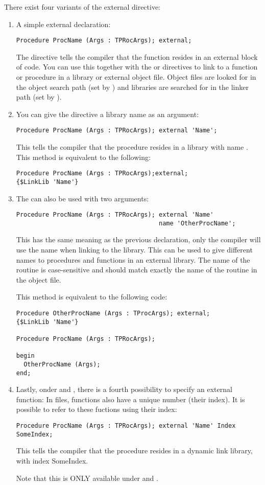 There exist four variants of the external directive:
\begin{enumerate}
\item A simple external declaration:
\begin{verbatim}
Procedure ProcName (Args : TPRocArgs); external;
\end{verbatim}
The  directive tells the compiler that the function resides in
an external block of code. You can use this together with the 
or  directives to link to a function or procedure in a
library or external object file. Object files are looked for in the object
search path (set by ) and libraries are searched for in the linker
path (set by ).

\item You can give the  directive a library name as an
argument:
\begin{verbatim}
Procedure ProcName (Args : TPRocArgs); external 'Name';
\end{verbatim}
This tells the compiler that the procedure resides in a library with name
. This method is equivalent to the following:
\begin{verbatim}
Procedure ProcName (Args : TPRocArgs);external;
{$LinkLib 'Name'}
\end{verbatim}
\item The  can also be used with two arguments:
\begin{verbatim}
Procedure ProcName (Args : TPRocArgs); external 'Name'
                                       name 'OtherProcName';
\end{verbatim}
This has the same meaning as the previous declaration, only the compiler
will use the name  when linking to the library. This
can be used to give different names to procedures and functions in an
external library. The name of the routine is case-sensitive and should
match exactly the name of the routine in the object file.

This method is equivalent to the following code:
\begin{verbatim}
Procedure OtherProcName (Args : TProcArgs); external;
{$LinkLib 'Name'}

Procedure ProcName (Args : TPRocArgs);

begin
  OtherProcName (Args);
end;
\end{verbatim}
\item Lastly, onder \windows and \ostwo, there is a fourth possibility
to specify an external function: In  files, functions also have
a unique number (their index). It is possible to refer to these fuctions
using their index:
\begin{verbatim}
Procedure ProcName (Args : TPRocArgs); external 'Name' Index SomeIndex;
\end{verbatim}
This tells the compiler that the procedure  resides in a
dynamic link library, with index {SomeIndex}.

\begin{remark}Note that this is ONLY available under \windows and \ostwo.
\end{remark}
\end{enumerate}

